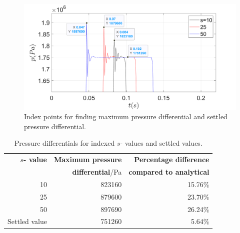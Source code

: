 \begin{figure}[H]
    \centering
    \includegraphics[width = 0.9 \textwidth]{img/fig3.png}
    \caption{Index points for finding maximum pressure differential and settled pressure differential.}
    \label{pressure2}
\end{figure}

\begin{table}[H]
    \centering
    \begin{tabular}{@{}rrr@{}}
        \toprule
        \textbf{$s$- value} & \textbf{Maximum pressure }         & \textbf{Percentage difference}  \\
                            & \textbf{differential}/\si{\pascal} & \textbf{compared to analytical} \\
        \midrule
        10                  & 823160                             & 15.76\%                         \\
        25                  & 879600                             & 23.70\%                         \\
        50                  & 897690                             & 26.24\%                         \\
        Settled value       & 751260                             & 5.64\%                          \\
        \bottomrule
    \end{tabular}
    \caption{Pressure differentials for indexed $s$- values and settled values.}
    \label{matlabResults}
\end{table}
